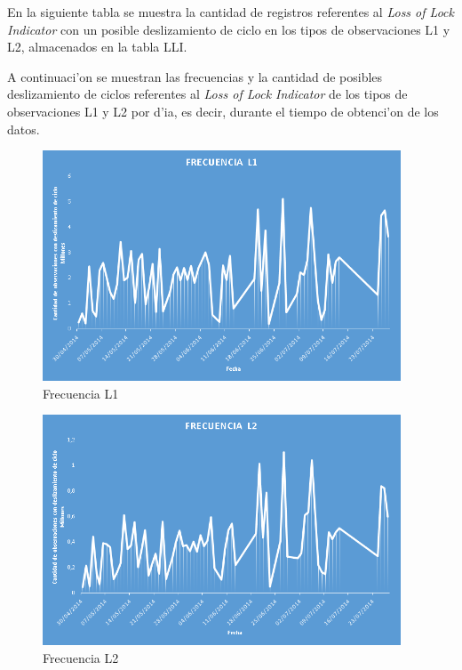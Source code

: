 En la siguiente tabla se muestra la cantidad de registros referentes al \emph{Loss of Lock Indicator} con un posible deslizamiento de ciclo en los tipos de observaciones L1 y L2, almacenados en la tabla LLI.

\begin{table}[H]
\begin{center}
\end{center}
\caption{Cantidad de registros con posible deslizamiento de ciclo, L1 y L2}
\end{table}

A continuaci'on se muestran las frecuencias y la cantidad de posibles deslizamiento de ciclos referentes al \emph{Loss of Lock Indicator} de los tipos de observaciones L1 y L2 por d'ia, es decir, durante el tiempo de obtenci'on de los datos.\\

\begin{figure}[H]
\centering
\includegraphics[width=0.95\textwidth]{images/Frecuency_L1}
\caption{Frecuencia L1}
\label{fig:6.2}
\end{figure}

\begin{figure}[H]
\centering
\includegraphics[width=0.95\textwidth]{images/Frecuency_L2}
\caption{Frecuencia L2}
\label{fig:6.3}
\end{figure}

